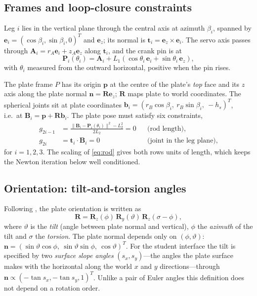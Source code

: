 \documentclass[10pt,a4paper]{article}
\newcommand{\vect}[1]{\bm{#1}}
\newcommand{\hatn}{\vect{n}}
\begin{document}
\subsection{Frames and loop-closure constraints}
Leg $i$ lies in the vertical plane through the central axis at azimuth $\beta_i$, spanned by
$\vect e_i=(\cos\beta_i,\sin\beta_i,0)^T$ and $\vect e_z$; its normal is
$\vect t_i=\vect e_z\times\vect e_i$. The servo axis passes through
$\vect A_i=r_A\vect e_i+z_A\vect e_z$ along $\vect t_i$, and the crank pin is at
\begin{equation}
  \vect P_i(\theta_i)=\vect A_i+L_1\left(\cos\theta_i\,\vect e_i+\sin\theta_i\,\vect e_z\right),
\end{equation}
with $\theta_i$ measured from the outward horizontal, positive when the pin rises.

The plate frame $P$ has its origin $\vect p$ at the centre of the plate's \emph{top} face and its
$z$ axis along the plate normal $\hatn=\vect R\vect e_z$; $\vect R$ maps plate to world
coordinates. The spherical joints sit at plate coordinates
$\vect b_i=(r_B\cos\beta_i,\ r_B\sin\beta_i,\ -h_s)^T$, i.e.\ at
$\vect B_i=\vect p+\vect R\vect b_i$. The plate pose must satisfy six constraints,
\begin{align}
  g_{2i-1}&=\frac{\lVert\vect B_i-\vect P_i(\theta_i)\rVert^2-L_2^2}{2L_2}=0
  &&\text{(rod length)}, \label{eq:rod}\\
  g_{2i}&=\vect t_i\cdot\vect B_i=0 &&\text{(joint in the leg plane)}, \label{eq:plane}
\end{align}
for $i=1,2,3$. The scaling of \eqref{eq:rod} gives both rows units of length, which keeps the
Newton iteration below well conditioned.

\subsection{Orientation: tilt-and-torsion angles}
Following \citet{bonev2002advantages}, the plate orientation is written as
\begin{equation}
  \vect R=\vect R_z(\phi)\,\vect R_y(\vartheta)\,\vect R_z(\sigma-\phi),
\end{equation}
where $\vartheta$ is the \emph{tilt} (angle between plate normal and vertical), $\phi$ the
\emph{azimuth} of the tilt and $\sigma$ the \emph{torsion}. The plate normal depends only on
$(\phi,\vartheta)$: $\hatn=(\sin\vartheta\cos\phi,\ \sin\vartheta\sin\phi,\ \cos\vartheta)^T$.
For the student interface the tilt is specified by two \emph{surface slope angles}
$(s_x,s_y)$---the angles the plate surface makes with the horizontal along the world $x$ and
$y$ directions---through $\hatn\propto(-\tan s_x,-\tan s_y,1)^T$. Unlike a pair of Euler angles
this definition does not depend on a rotation order.
\end{document}
